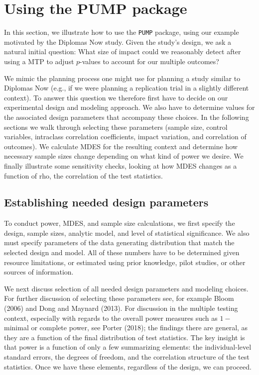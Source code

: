\documentclass[
]{article}
\begin{document}
\section{Using the PUMP package}
\label{sec:vignette}

In this section, we illustrate how to use the \texttt{PUMP} package,
using our example motivated by the Diplomas Now study. Given the study's
design, we ask a natural initial question: What size of impact could we
reasonably detect after using a MTP to adjust \(p\)-values to account
for our multiple outcomes?

We mimic the planning process one might use for planning a study similar
to Diplomas Now (e.g., if we were planning a replication trial in a
slightly different context). To answer this question we therefore first
have to decide on our experimental design and modeling approach. We also
have to determine values for the associated design parameters that
accompany these choices. In the following sections we walk through
selecting these parameters (sample size, control variables, intraclass
correlation coefficients, impact variation, and correlation of
outcomes). We calculate MDES for the resulting context and determine how
necessary sample sizes change depending on what kind of power we desire.
We finally illustrate some sensitivity checks, looking at how MDES
changes as a function of rho, the correlation of the test statistics.

\subsection{Establishing needed design parameters}

To conduct power, MDES, and sample size calculations, we first specify
the design, sample sizes, analytic model, and level of statistical
significance. We also must specify parameters of the data generating
distribution that match the selected design and model. All of these
numbers have to be determined given resource limitations, or estimated
using prior knowledge, pilot studies, or other sources of information.

We next discuss selection of all needed design parameters and modeling
choices. For further discussion of selecting these parameters see, for
example Bloom (2006) and Dong and Maynard (2013). For discussion in the
multiple testing context, especially with regards to the overall power
measures such as \(1-\)minimal or complete power, see Porter (2018); the
findings there are general, as they are a function of the final
distribution of test statistics. The key insight is that power is a
function of only a few summarizing elements: the individual-level
standard errors, the degrees of freedom, and the correlation structure
of the test statistics. Once we have these elements, regardless of the
design, we can proceed.
\end{document}
